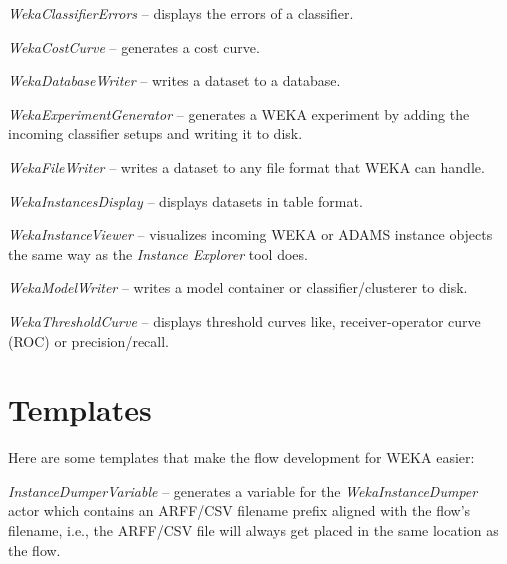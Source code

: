 \begin{tight_itemize}
	\item \textit{WekaClassifierErrors} -- displays the errors of a classifier.
	\item \textit{WekaCostCurve} -- generates a cost curve.
	\item \textit{WekaDatabaseWriter} -- writes a dataset to a database.
	\item \textit{WekaExperimentGenerator} -- generates a WEKA experiment by 
	adding the incoming classifier setups and writing it to disk.
	\item \textit{WekaFileWriter} -- writes a dataset to any file format that
	WEKA can handle.
	\item \textit{WekaInstancesDisplay} -- displays datasets in table format.
	\item \textit{WekaInstanceViewer} -- visualizes incoming WEKA or ADAMS
	instance objects the same way as the \textit{Instance Explorer} tool does.
	\item \textit{WekaModelWriter} -- writes a model container or 
	classifier/clusterer to disk.
	\item \textit{WekaThresholdCurve} -- displays threshold curves like, 
	receiver-operator curve (ROC) or precision/recall.
\end{tight_itemize}

\section{Templates}
Here are some templates that make the flow development for WEKA easier:
\begin{tight_itemize}
	\item \textit{InstanceDumperVariable} -- generates a variable for the 
	\textit{WekaInstanceDumper} actor which contains an ARFF/CSV filename 
	prefix aligned with the flow's filename, i.e., the ARFF/CSV file will 
	always get placed in the same location as the flow.
\end{tight_itemize}
